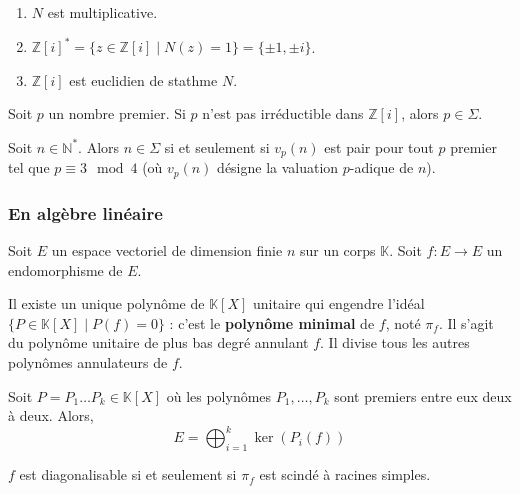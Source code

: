 	\begin{lemma}
		\begin{enumerate}[label=(\roman*)]
			\item $N$ est multiplicative.
			\item $\mathbb{Z}[i]^* = \{ z \in \mathbb{Z}[i] \mid N(z) = 1 \} = \{ \pm 1, \pm i \}$.
			\item $\mathbb{Z}[i]$ est euclidien de stathme $N$.
		\end{enumerate}
	\end{lemma}

	\begin{lemma}
		Soit $p$ un nombre premier. Si $p$ n'est pas irréductible dans $\mathbb{Z}[i]$, alors $p \in \Sigma$.
	\end{lemma}


	\begin{theorem}
		Soit $n \in \mathbb{N}^*$. Alors $n \in \Sigma$ si et seulement si $v_p(n)$ est pair pour tout $p$ premier tel que $p \equiv 3 \mod 4$ (où $v_p(n)$ désigne la valuation $p$-adique de $n$).
	\end{theorem}

	\subsubsection{En algèbre linéaire}

	Soit $E$ un espace vectoriel de dimension finie $n$ sur un corps $\mathbb{K}$. Soit $f : E \rightarrow E$ un endomorphisme de $E$.


	\begin{application}
		Il existe un unique polynôme de $\mathbb{K}[X]$ unitaire qui engendre l'idéal $\{ P \in \mathbb{K}[X] \mid P(f) = 0 \}$ : c'est le \textbf{polynôme minimal} de $f$, noté $\pi_f$. Il s'agit du polynôme unitaire de plus bas degré annulant $f$. Il divise tous les autres polynômes annulateurs de $f$.
	\end{application}


	\begin{theorem}
		Soit $P = P_1 \dots P_k \in \mathbb{K}[X]$ où les polynômes $P_1, \dots, P_k$ sont premiers entre eux deux à deux. Alors,
		\[ E = \bigoplus_{i=1}^k \ker(P_i(f)) \]
	\end{theorem}

	\begin{application}
		$f$ est diagonalisable si et seulement si $\pi_f$ est scindé à racines simples.
	\end{application}

